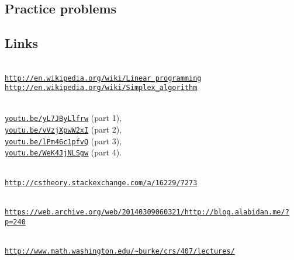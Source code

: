 \documentclass[11pt,oneside]{article}
\begin{document}
	\subsection{Practice problems}

		



	\subsection{Links}

		 \\
		\href{http://en.wikipedia.org/wiki/Linear_programming}{\texttt{http://en.wikipedia.org/wiki/Linear\_programming}} \\ 
		\href{http://en.wikipedia.org/wiki/Simplex_algorithm}{\texttt{http://en.wikipedia.org/wiki/Simplex\_algorithm}}

		\medskip
		 \\
		\href{https://youtu.be/yL7JByLlfrw} 
			{\texttt{youtu.be/yL7JByLlfrw}} (part 1), \\
		\href{https://youtu.be/vVzjXpwW2xI}
			{\texttt{youtu.be/vVzjXpwW2xI}} (part 2), \\
		\href{https://youtu.be/lPm46c1pfvQ}
			{\texttt{youtu.be/lPm46c1pfvQ}} (part 3),  \\
		\href{https://youtu.be/WeK4JjNLSgw}
			{\texttt{youtu.be/WeK4JjNLSgw}} (part 4).


		\medskip
		 \\
		\href{http://cstheory.stackexchange.com/a/16229/7273}
			{\texttt{http://cstheory.stackexchange.com/a/16229/7273}}

		\medskip
		 \\ 
		\href{https://web.archive.org/web/20140309060321/http://blog.alabidan.me/?p=240}
			{\texttt{https://web.archive.org/web/20140309060321/http://blog.alabidan.me/?p=240}}

		\medskip
		 \\
		\href{http://www.math.washington.edu/~burke/crs/407/lectures/}
	            {\texttt{http://www.math.washington.edu/\textasciitilde{}burke/crs/407/lectures/}}
\end{document}
